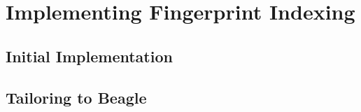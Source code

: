 
\chapter{Implementing Fingerprint Indexing}
\label{cha:method}

\section{Initial Implementation}
\label{sec:why2}

\section{Tailoring to Beagle}
\label{sec:what2}

